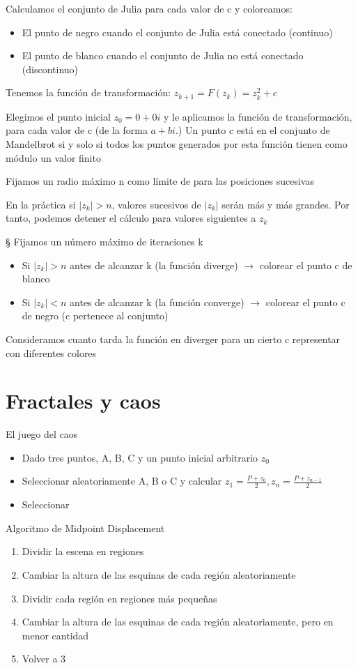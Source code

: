 Calculamos el conjunto de Julia para cada valor de c y coloreamos:
\begin{itemize}
    \item El punto de negro cuando el conjunto de Julia está conectado (continuo)
    \item El punto de blanco cuando el conjunto de Julia no está conectado (discontinuo)
\end{itemize}

Tenemos la función de transformación: $z_{k+1}=F(z_k)=z^2_k + c$

Elegimos el punto inicial $z_0 = 0 + 0i$ y le aplicamos la función de transformación, para
cada valor de c (de la forma $a + bi$.) Un punto c está en el conjunto de Mandelbrot si y solo si todos los puntos generados por esta función tienen como módulo un valor finito

Fijamos un radio máximo n como límite de para las posiciones sucesivas

En la práctica si $|z_k| > n$, valores sucesivos de $|z_k|$ serán más y más grandes. Por tanto,
podemos detener el cálculo para valores siguientes a $z_k$

§ Fijamos un número máximo de iteraciones k
\begin{itemize}
    \item Si $|z_k| > n$ antes de alcanzar k (la función diverge) $\rightarrow$ colorear el punto c de blanco
    \item Si $|z_k| < n$ antes de alcanzar k (la función converge) $\rightarrow$ colorear el punto c de negro (c pertenece al conjunto)
\end{itemize}

Consideramos cuanto tarda la función en diverger para un cierto c  representar con diferentes colores

\section{Fractales y caos}
El juego del caos
\begin{itemize}
    \item Dado tres puntos, A, B, C y un punto inicial arbitrario $z_0$
    \item Seleccionar aleatoriamente A, B o C y calcular $z_1 = \frac{P+ z_0}{2}, z_n = \frac{P+ z_{n-1}}{2}$
    \item Seleccionar
\end{itemize}

Algoritmo de Midpoint Displacement
\begin{enumerate}
    \item Dividir la escena en regiones
    \item Cambiar la altura de las esquinas de cada región aleatoriamente
    \item Dividir cada región en regiones más pequeñas
    \item Cambiar la altura de las esquinas de cada región aleatoriamente, pero en menor cantidad
    \item Volver a 3
\end{enumerate}
